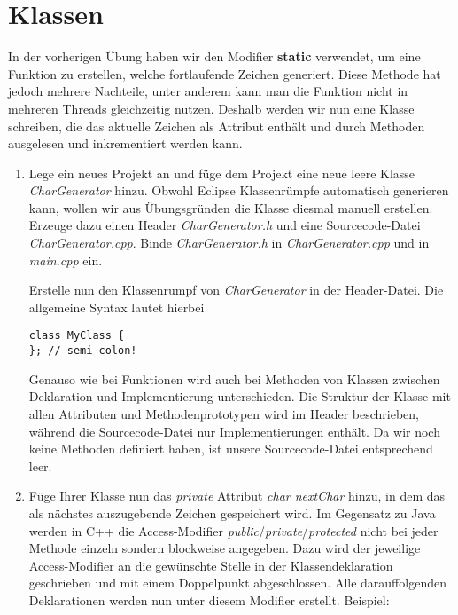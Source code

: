\section{Klassen}

In der vorherigen Übung haben wir den Modifier \textbf{static} verwendet, um eine Funktion zu erstellen, welche fortlaufende Zeichen generiert.
Diese Methode hat jedoch mehrere Nachteile, unter anderem kann man die Funktion nicht in mehreren Threads gleichzeitig nutzen.
Deshalb werden wir nun eine Klasse schreiben, die das aktuelle Zeichen als Attribut enthält und durch Methoden ausgelesen und inkrementiert werden kann.

\begin{enumerate}

\item
Lege ein neues Projekt an und füge dem Projekt eine neue leere Klasse \emph{CharGenerator} hinzu.
Obwohl Eclipse Klassenrümpfe automatisch generieren kann, wollen wir aus Übungsgründen die Klasse diesmal manuell erstellen.
Erzeuge dazu einen Header \emph{CharGenerator.h} und eine Sourcecode-Datei \emph{CharGenerator.cpp}.
Binde \emph{CharGenerator.h} in \emph{CharGenerator.cpp} und in \emph{main.cpp} ein.

Erstelle nun den Klassenrumpf von \emph{CharGenerator} in der Header-Datei. Die allgemeine Syntax lautet hierbei 

\begin{lstlisting}
class MyClass {  
}; // semi-colon!
\end{lstlisting}

Genauso wie bei Funktionen wird auch bei Methoden von Klassen zwischen Deklaration und Implementierung unterschieden.
Die Struktur der Klasse mit allen Attributen und Methodenprototypen wird im Header beschrieben, während die Sourcecode-Datei nur Implementierungen enthält.
Da wir noch keine Methoden definiert haben, ist unsere Sourcecode-Datei entsprechend leer.

\item
Füge Ihrer Klasse nun das \emph{private} Attribut \emph{char nextChar} hinzu, in dem das als nächstes auszugebende Zeichen gespeichert wird. Im Gegensatz zu Java  werden in C++ die Access-Modifier \emph{public}/\emph{private}/\emph{protected} nicht bei jeder Methode einzeln sondern blockweise angegeben. Dazu wird der jeweilige Access-Modifier an die gewünschte Stelle in der Klassendeklaration geschrieben und mit einem Doppelpunkt abgeschlossen.  Alle darauffolgenden Deklarationen werden nun unter diesem Modifier erstellt. Beispiel:


\end{enumerate}
